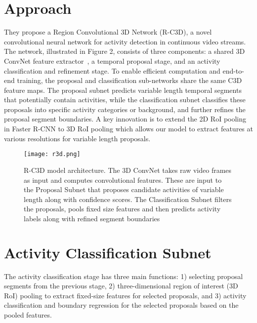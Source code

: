 \documentclass[10pt,twocolumn,letterpaper]{article}
\begin{document}
\section{Approach}
They propose a Region Convolutional 3D Network (R-C3D), a novel convolutional neural network for activity detection in continuous video streams. The network, illustrated in Figure 2, consists of three components: a shared 3D ConvNet feature extractor~\cite{name32}, a temporal proposal stage, and an activity classification and refinement stage.
To enable efficient computation and end-to-end training,
the proposal and classification sub-networks share the same
C3D feature maps. The proposal subnet predicts variable
length temporal segments that potentially contain activities,
while the classification subnet classifies these proposals into
specific activity categories or background, and further refines the proposal segment boundaries. A key innovation is to extend the 2D RoI pooling in Faster R-CNN to 3D RoI pooling which allows our model to extract features at various resolutions for variable length proposals.
  \begin{figure}[!htb]
  	\centering
  	\texttt{[image: r3d.png]}\\
  	\caption{R-C3D model architecture. The 3D ConvNet takes raw video frames as input and computes convolutional features. These are
  		input to the Proposal Subnet that proposes candidate activities of variable length along with confidence scores. The Classification Subnet
  		filters the proposals, pools fixed size features and then predicts activity labels along with refined segment boundaries}\label{Figure2} 
  \end{figure}
\section{Activity Classification Subnet}
The activity classification stage has three main functions:
1) selecting proposal segments from the previous stage, 2) three-dimensional region of interest (3D RoI) pooling to extract fixed-size features for selected proposals, and 3) activity classification and boundary regression for the selected proposals based on the pooled features. 


\end{document}
